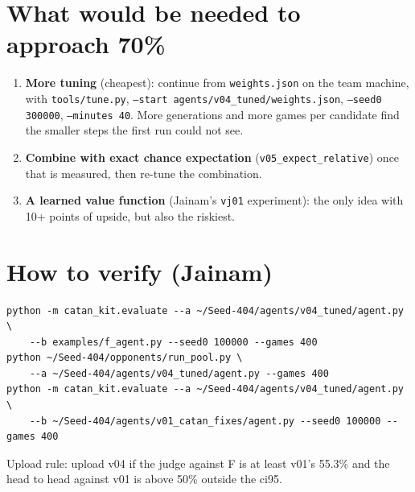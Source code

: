 \documentclass[11pt]{article}
\begin{document}
\section{What would be needed to approach 70\%}\label{sec:next}
\begin{enumerate}
  \item \textbf{More tuning} (cheapest): continue from \texttt{weights.json} on the team machine,
    with \texttt{tools/tune.py}, \texttt{--start agents/v04\_tuned/weights.json},
    \texttt{--seed0 300000}, \texttt{--minutes 40}. More generations and more games
    per candidate find the smaller steps the first run could not see.
  \item \textbf{Combine with exact chance expectation} (\texttt{v05\_expect\_relative}) once that is
    measured, then re-tune the combination.
  \item \textbf{A learned value function} (Jainam's \texttt{vj01} experiment): the only idea with
    10+ points of upside, but also the riskiest.
\end{enumerate}

\section*{How to verify (Jainam)}
\begin{verbatim}
python -m catan_kit.evaluate --a ~/Seed-404/agents/v04_tuned/agent.py \
    --b examples/f_agent.py --seed0 100000 --games 400
python ~/Seed-404/opponents/run_pool.py \
    --a ~/Seed-404/agents/v04_tuned/agent.py --games 400
python -m catan_kit.evaluate --a ~/Seed-404/agents/v04_tuned/agent.py \
    --b ~/Seed-404/agents/v01_catan_fixes/agent.py --seed0 100000 --games 400
\end{verbatim}
Upload rule: upload v04 if the judge against F is at least v01's 55.3\% and the head to head
against v01 is above 50\% outside the ci95.
\end{document}
